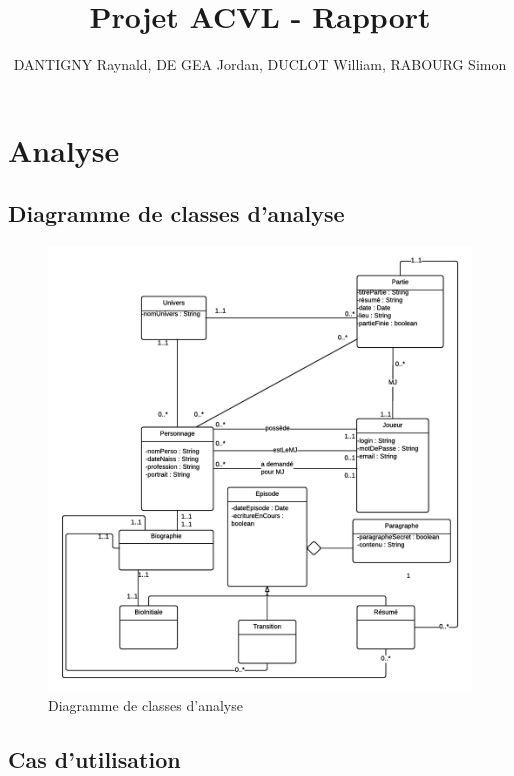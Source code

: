 \documentclass[a4paper,oneside,10pt]{article}
\title{Projet ACVL - Rapport}
\author{DANTIGNY Raynald, DE GEA Jordan, DUCLOT William, RABOURG Simon}
\begin{document}
\maketitle

\tableofcontents


\pagebreak
\section{Analyse}
\subsection{Diagramme de classes d'analyse}
\begin{figure}[H]
\begin{center}
\includegraphics[width=\textwidth]{images/classe/DiagrammeClasse.png} 
	\caption{Diagramme de classes d'analyse}
\end{center}
\end{figure}


\pagebreak
\subsection{Cas d'utilisation}
\end{document}
